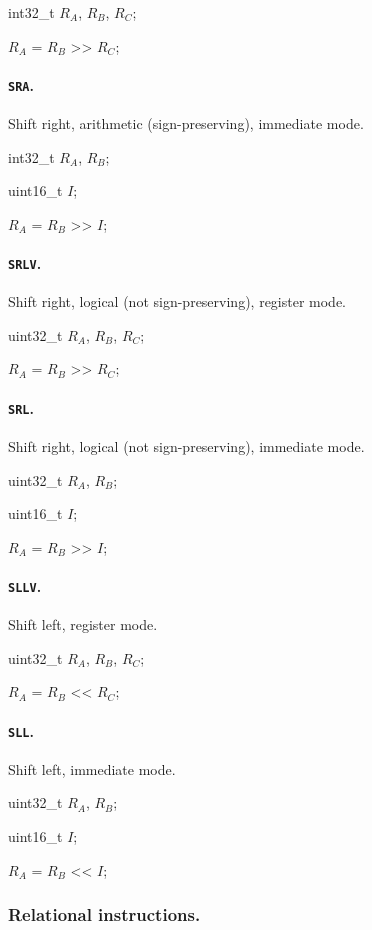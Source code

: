 \documentclass[12pt,english,twoside]{report}
\def\code{\texttt}
\def\subsubsubsection{\paragraph}
\newenvironment{codeblock}
{\begin{list}{}{
\setlength{\rightmargin}{\leftmargin}
\setlength{\listparindent}{0pt}%
\raggedright
\setlength{\itemsep}{0pt}
\setlength{\parsep}{0pt}
\normalfont\ttfamily}%
 \item[]}
{\end{list}}
\begin{document}
\begin{codeblock}
  int32\_t $R_A$, $R_B$, $R_C$;

  $R_A$ = $R_B$ >{}> $R_C$;
\end{codeblock}

\subsubsubsection{\label{sec:Ins_SRA}\code{SRA}.}
Shift right, arithmetic (sign-preserving), immediate mode.

\begin{codeblock}
  int32\_t $R_A$, $R_B$;

  uint16\_t $I$;

  $R_A$ = $R_B$ >{}> $I$;
\end{codeblock}

\subsubsubsection{\label{sec:Ins_SRLV}\code{SRLV}.}
Shift right, logical (not sign-preserving), register mode.

\begin{codeblock}
  uint32\_t $R_A$, $R_B$, $R_C$;

  $R_A$ = $R_B$ >{}> $R_C$;
\end{codeblock}

\subsubsubsection{\label{sec:Ins_SRL}\code{SRL}.}
Shift right, logical (not sign-preserving), immediate mode.

\begin{codeblock}
  uint32\_t $R_A$, $R_B$;

  uint16\_t $I$;

  $R_A$ = $R_B$ >{}> $I$;
\end{codeblock}

\subsubsubsection{\label{sec:Ins_SLLV}\code{SLLV}.}
Shift left, register mode.

\begin{codeblock}
  uint32\_t $R_A$, $R_B$, $R_C$;

  $R_A$ = $R_B$ <{}< $R_C$;
\end{codeblock}

\subsubsubsection{\label{sec:Ins_SLL}\code{SLL}.}
Shift left, immediate mode.

\begin{codeblock}
  uint32\_t $R_A$, $R_B$;

  uint16\_t $I$;

  $R_A$ = $R_B$ <{}< $I$;
\end{codeblock}

\subsubsection{Relational instructions.}
\end{document}
